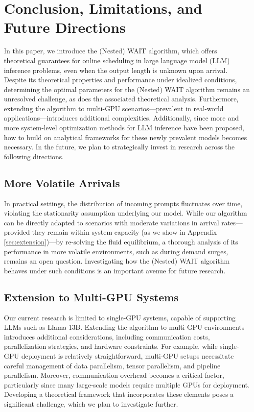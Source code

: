 \section{Conclusion, Limitations, and Future Directions}

In this paper, we introduce the (Nested) WAIT algorithm, which offers theoretical guarantees for online scheduling in large language model (LLM) inference problems, even when the output length is unknown upon arrival. Despite its theoretical properties and performance under idealized conditions, determining the optimal parameters for the (Nested) WAIT algorithm remains an unresolved challenge, as does the associated theoretical analysis. Furthermore, extending the algorithm to multi-GPU scenarios---prevalent in real-world applications---introduces additional complexities. Additionally, since more and more system-level optimization methods for LLM inference have been proposed, how to build on analytical frameworks for these newly prevalent models becomes necessary. In the future, we plan to strategically invest in research across the following directions.

\subsection{More Volatile Arrivals}

In practical settings, the distribution of incoming prompts fluctuates over time, violating the stationarity assumption underlying our model. While our algorithm can be directly adapted to scenarios with moderate variations in arrival rates—provided they remain within system capacity (as we show in Appendix \ref{sec:extension})—by re-solving the fluid equilibrium, a thorough analysis of its performance in more volatile environments, such as during demand surges, remains an open question. Investigating how the (Nested) WAIT algorithm behaves under such conditions is an important avenue for future research.

\subsection{Extension to Multi-GPU Systems}
Our current research is limited to single-GPU systems, capable of supporting LLMs such as Llama-13B. Extending the algorithm to multi-GPU environments introduces additional considerations, including communication costs, parallelization strategies, and hardware constraints. For example, while single-GPU deployment is relatively straightforward, multi-GPU setups necessitate careful management of data parallelism, tensor parallelism, and pipeline parallelism. Moreover, communication overhead becomes a critical factor, particularly since many large-scale models require multiple GPUs for deployment. Developing a theoretical framework that incorporates these elements poses a significant challenge, which we plan to investigate further.

